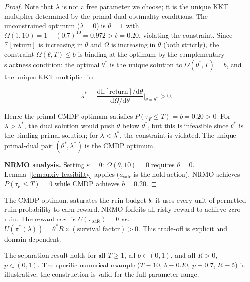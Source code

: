 \begin{proof}
Note that $\lambda$ is not a free parameter we choose; it is the
unique KKT multiplier determined by the primal-dual optimality
conditions. The unconstrained optimum ($\lambda = 0$) is
$\theta = 1$ with $\Omega(1, 10) = 1 - (0.7)^{10} = 0.972 > b =
0.20$, violating the constraint. Since $\mathbb{E}[\mathrm{return}]$
is increasing in $\theta$ and $\Omega$ is increasing in $\theta$
(both strictly), the constraint $\Omega(\theta, T) \le b$ is binding
at the optimum by the complementary slackness condition: the optimal
$\theta^*$ is the unique solution to $\Omega(\theta^*, T) = b$, and
the unique KKT multiplier is:

\begin{equation}
\lambda^* = \frac{\mathrm{d}\mathbb{E}[\mathrm{return}] /
\mathrm{d}\theta}{\mathrm{d}\Omega / \mathrm{d}\theta}
\bigg\rvert_{\theta = \theta^*} > 0.
\end{equation}

Hence the primal CMDP optimum satisfies $P(\tau_F \le T) = b =
0.20 > 0$. For $\lambda > \lambda^*$, the dual solution would push
$\theta$ below $\theta^*$, but this is infeasible since $\theta^*$
is the binding primal solution; for $\lambda < \lambda^*$, the
constraint is violated. The unique primal-dual pair
$(\theta^*, \lambda^*)$ is the CMDP optimum.

\medskip\noindent\textbf{NRMO analysis.}
Setting $\varepsilon = 0$: $\Omega(\theta, 10) = 0$ requires $\theta
= 0$. Lemma~\ref{lem:arxiv-feasibility} applies
($a_{\mathrm{safe}}$ is the hold action). NRMO achieves
$P(\tau_F \le T) = 0$ while CMDP achieves $b = 0.20$.
\end{proof}

\begin{remark}[Interpretation]
\label{rem:arxiv-thm2-interpretation}
The CMDP optimum saturates the ruin budget $b$: it uses every unit
of permitted ruin probability to earn reward. NRMO forfeits all
risky reward to achieve zero ruin. The reward cost is
$U(\pi_{\mathrm{safe}}) = 0$ vs.~$U(\pi^*(\lambda)) =
\theta^* R \times (\text{survival factor}) > 0$. This trade-off is
explicit and domain-dependent.
\end{remark}

\begin{remark}[Generality]
\label{rem:arxiv-thm2-generality}
The separation result holds for all $T \ge 1$, all $b \in (0, 1)$,
and all $R > 0$, $p \in (0, 1)$. The specific numerical example
($T = 10$, $b = 0.20$, $p = 0.7$, $R = 5$) is illustrative; the
construction is valid for the full parameter range.
\end{remark}


